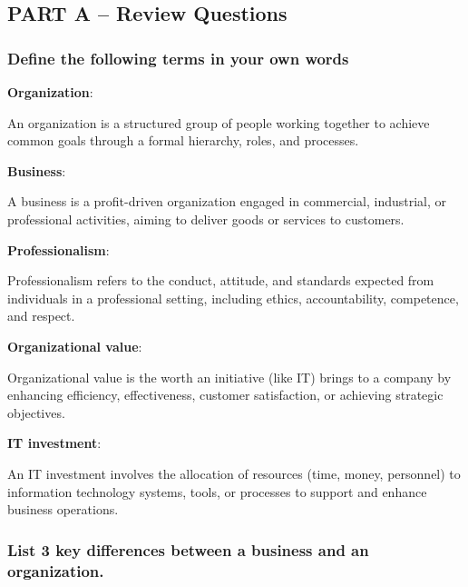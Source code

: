 \subsection{PART A – Review Questions}

\subsubsection{Define the following terms in your own words}

\noindent\textbf{Organization}: 

An organization is a structured group of people working together to achieve common goals through a formal hierarchy, roles, and processes.

\noindent\textbf{Business}: 

A business is a profit-driven organization engaged in commercial, industrial, or professional activities, aiming to deliver goods or services to customers.

\noindent\textbf{Professionalism}: 

Professionalism refers to the conduct, attitude, and standards expected from individuals in a professional setting, including ethics, accountability, competence, and respect.

\noindent\textbf{Organizational value}: 

Organizational value is the worth an initiative (like IT) brings to a company by enhancing efficiency, effectiveness, customer satisfaction, or achieving strategic objectives.

\noindent\textbf{IT investment}: 

An IT investment involves the allocation of resources (time, money, personnel) to information technology systems, tools, or processes to support and enhance business operations.

\subsubsection{List 3 key differences between a business and an organization.}

\indent

